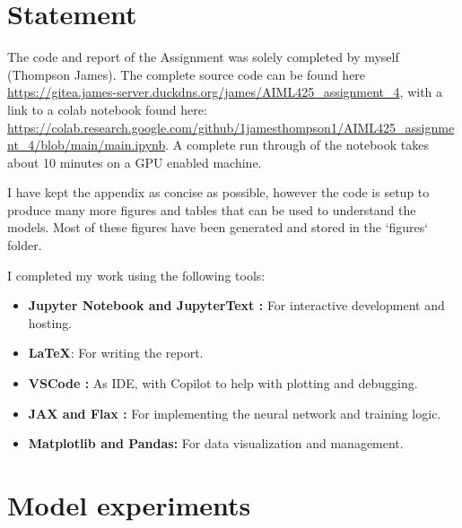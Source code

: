 \documentclass[conference,a4paper]{IEEEtran}
\begin{document}
\newpage
\section*{Statement}

The code and report of the Assignment was solely completed by myself (Thompson James). The complete source code can be found here \url{https://gitea.james-server.duckdns.org/james/AIML425\_assignment\_4}, with a link to a colab notebook found here: \url{https://colab.research.google.com/github/1jamesthompson1/AIML425_assignment_4/blob/main/main.ipynb}. A complete run through of the notebook takes about 10 minutes on a GPU enabled machine.

I have kept the appendix as concise as possible, however the code is setup to produce many more figures and tables that can be used to understand the models. Most of these figures have been generated and stored in the `figures` folder.

I completed my work using the following tools:
\begin{itemize}
    \item \textbf{Jupyter Notebook \cite{Kluyver2016jupyter} and JupyterText \cite{woutsMwoutsJupytext2025}:} For interactive development and hosting.
    \item \textbf{\LaTeX}: For writing the report.
    \item \textbf{VSCode \cite{MicrosoftVscode2025}:} As IDE, with Copilot to help with plotting and debugging.
    \item \textbf{JAX \cite{jax2018github} and Flax \cite{flax2020github}:} For implementing the neural network and training logic.
    \item \textbf{Matplotlib\cite{Hunter:2007} and Pandas\cite{thepandasdevelopmentteamPandasdevPandasPandas}:} For data visualization and management.
\end{itemize}





\appendix

\section{Model experiments}
\end{document}
